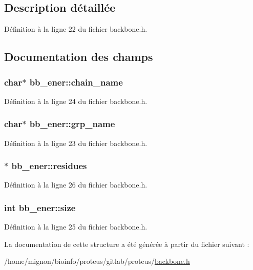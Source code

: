 \subsection{Description détaillée}


Définition à la ligne 22 du fichier backbone.\+h.



\subsection{Documentation des champs}
\hypertarget{structbb__ener_ae278605bdc31a3f2d9b6a78b6818ccc7}{
\subsubsection[{chain\+\_\+name}]{\setlength{\rightskip}{0pt plus 5cm}char$\ast$ bb\+\_\+ener\+::chain\+\_\+name}}\label{structbb__ener_ae278605bdc31a3f2d9b6a78b6818ccc7}


Définition à la ligne 24 du fichier backbone.\+h.

\hypertarget{structbb__ener_a0bdd0dade60d496d91110f355912c3b2}{
\subsubsection[{grp\+\_\+name}]{\setlength{\rightskip}{0pt plus 5cm}char$\ast$ bb\+\_\+ener\+::grp\+\_\+name}}\label{structbb__ener_a0bdd0dade60d496d91110f355912c3b2}


Définition à la ligne 23 du fichier backbone.\+h.

\hypertarget{structbb__ener_abc8f47b185def941f8f68fefd38eb628}{
\subsubsection[{residues}]{$\ast$ bb\+\_\+ener\+::residues}}\label{structbb__ener_abc8f47b185def941f8f68fefd38eb628}


Définition à la ligne 26 du fichier backbone.\+h.

\hypertarget{structbb__ener_a3b5d8e5f4c32f990a1b7a87c95ae74e2}{
\subsubsection[{size}]{\setlength{\rightskip}{0pt plus 5cm}int bb\+\_\+ener\+::size}}\label{structbb__ener_a3b5d8e5f4c32f990a1b7a87c95ae74e2}


Définition à la ligne 25 du fichier backbone.\+h.



La documentation de cette structure a été générée à partir du fichier suivant \+:\begin{DoxyCompactItemize}
\item 
/home/mignon/bioinfo/proteus/gitlab/proteus/\hyperlink{backbone_8h}{backbone.\+h}\end{DoxyCompactItemize}
